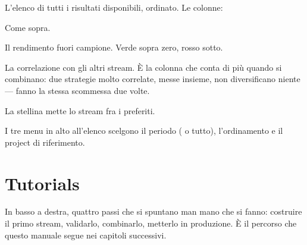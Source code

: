 L'elenco di tutti i risultati disponibili, ordinato. Le colonne:

\begin{description}[leftmargin = 1.4em, style = nextline, itemsep = 4pt]
  \item[\voce{Sharpe}] Come sopra.
  \item[\voce{OOS Return}] Il rendimento fuori campione. Verde sopra zero,
    rosso sotto.
  \item[\voce{Corr}] La correlazione con gli altri stream. È la colonna che
    conta di più quando si combinano: due strategie molto correlate, messe
    insieme, non diversificano niente --- fanno la stessa scommessa due volte.
  \item[\voce{Watch}] La stellina mette lo stream fra i preferiti.
\end{description}

\noindent
I tre menu in alto all'elenco scelgono il periodo ( o tutto),
l'ordinamento e il project di riferimento.

\section{Tutorials}\label{sez:overview-tutorial}

In basso a destra, quattro passi che si spuntano man mano che si fanno:
costruire il primo stream, validarlo, combinarlo, metterlo in produzione. È
il percorso che questo manuale segue nei capitoli successivi.
